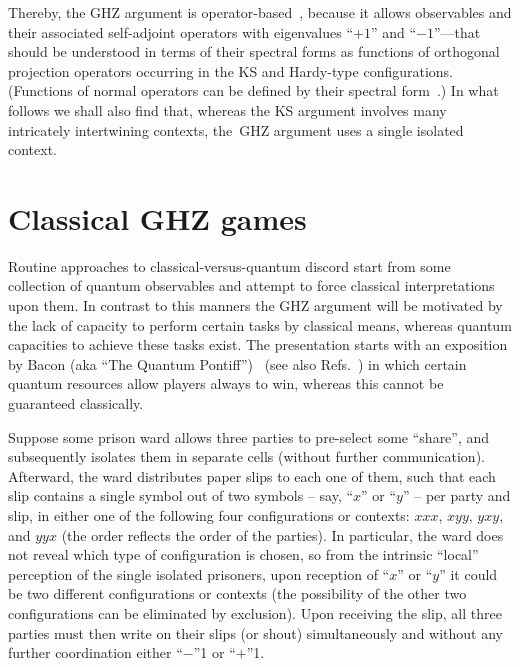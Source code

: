 \documentclass[sn-mathphys]{sn-jnl}%
\theoremstyle{thmstyleone}%
\theoremstyle{thmstyletwo}%
\theoremstyle{thmstylethree}%
\begin{document}
Thereby, the GHZ argument is operator-based~\cite{Holweck2017},
because it allows observables and their associated self-adjoint operators with eigenvalues
``$+1$'' and ``$-1$''---that should be understood in terms of their spectral forms as functions of orthogonal projection operators
occurring in the KS and Hardy-type configurations.
(Functions of normal operators can be defined  by their spectral form~\cite[\S~82, p.~165-169]{halmos-vs}.)
In what follows we shall also find that, whereas the KS argument involves many intricately intertwining contexts,
the~GHZ argument uses a single isolated context.

\section{Classical GHZ games}

Routine approaches to classical-versus-quantum discord start from some collection of quantum observables
and attempt to force classical interpretations upon them.
In contrast to this manners the GHZ argument will be motivated by
the lack of capacity to perform certain tasks by classical means,
whereas quantum capacities to achieve these tasks exist.
The presentation starts with an exposition by
Bacon (aka ``The Quantum Pontiff'')~\cite{bacon-ghzgames-2006} (see also Refs.~\cite{Broadbent-PRNLboxes,Scarani-prboxes})
in which certain quantum resources allow players always to win,
whereas this cannot be guaranteed classically.


Suppose some prison ward allows three parties to pre-select some ``share'', and subsequently isolates them in separate cells
(without further communication).
Afterward, the ward distributes paper slips to each one of them, such that each slip contains a single symbol out of two symbols -- say, ``$x$'' or ``$y$'' -- per party and slip,
in either one of the following four configurations or contexts: $xxx$, $xyy$, $yxy$, and $yyx$ (the order reflects the order of the parties).
In particular, the ward does not reveal which type of configuration is chosen,
so from the intrinsic ``local'' perception of the single isolated prisoners,
upon reception of ``$x$'' or ``$y$'' it could be two different configurations or contexts
(the possibility of the other two configurations can be eliminated by exclusion).
Upon receiving the slip, all three parties must then write on their slips (or shout) simultaneously and without any further coordination either ``$-$''1 or ``$+$''1.
\end{document}
